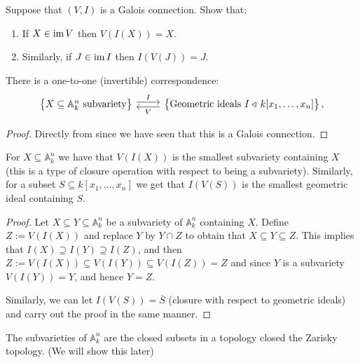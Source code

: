 \documentclass[11pt,a4paper]{article}
\newcommand{\A}{\mathbb A}
\begin{document}
\begin{exercise}
  \label{ex:galois-correspondence}
  Suppose that $(V,I)$ is a Galois connection.
  Show that:
  \begin{enumerate}
    \item[(1)] If $X \in \operatorname{im} V$ then $V(I(X)) = X$.
    \item[(2)] Similarly, if $J \in \operatorname{im} I$ then $I(V(J)) = J$.
  \end{enumerate}
\end{exercise}

\begin{corollary}
  There is a one-to-one (invertible) correspondence:
  \[
  \begin{tikzcd}
    \set{X \subseteq \A_k^n \text{ subvariety}}
    \arrow[r, shift left, "I"] &
    \set{\text{Geometric ideals } I \normalin k[x_1,\dots,x_n]}
    \arrow[l, shift left, "V"],
  \end{tikzcd}
  \]
\end{corollary}
\begin{proof}
  Directly from  since we have seen
  that this is a Galois connection.
\end{proof}

\begin{corollary}
  For $X \subseteq \A_k^n$ we have that $V(I(X))$ is the smallest
  subvariety containing $X$ (this is a type of closure operation with
  respect to being a subvariety).
  Similarly, for a subset $S \subseteq k[x_1,\dots,x_n]$
  we get that $I(V(S))$ is the smallest geometric ideal containing $S$.
\end{corollary}
\begin{proof}
  Let $X \subseteq Y \subseteq \A_k^n$ be a subvariety of $\A_k^n$
  containing $X$.
  Define $Z := V(I(X))$ and
  replace $Y$ by $Y \cap Z$ to obtain that $X \subseteq Y \subseteq Z$.
  This implies that $I(X) \supseteq I(Y) \supseteq I(Z)$,
  and then $Z := V(I(X)) \subseteq V(I(Y)) \subseteq V(I(Z)) = Z$
  and since $Y$ is a subvariety $V(I(Y)) = Y$,
  and hence $Y = Z$.

  Similarly,
  we can let $I(V(S)) = \overline S$ (closure with respect to geometric ideals)
  and carry out the proof in the same manner.
\end{proof}

\begin{remark}
  The subvarieties of $\A_k^n$ are the closed subsets in a topology closed
  the Zarisky topology. (We will show this later)
\end{remark}
\end{document}
